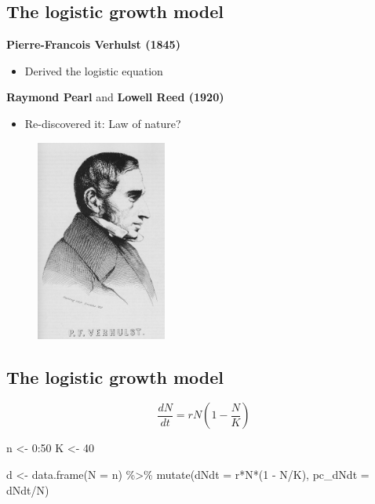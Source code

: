 \documentclass[
  letterpaper,
  DIV=11,
  numbers=noendperiod]{scrartcl}
\newenvironment{Shaded}{\begin{snugshade}}{\end{snugshade}}
\newcommand{\AttributeTok}[1]{\textcolor[rgb]{0.40,0.45,0.13}{#1}}
\newcommand{\DecValTok}[1]{\textcolor[rgb]{0.68,0.00,0.00}{#1}}
\newcommand{\FunctionTok}[1]{\textcolor[rgb]{0.28,0.35,0.67}{#1}}
\newcommand{\NormalTok}[1]{\textcolor[rgb]{0.00,0.23,0.31}{#1}}
\newcommand{\OtherTok}[1]{\textcolor[rgb]{0.00,0.23,0.31}{#1}}
\newcommand{\SpecialCharTok}[1]{\textcolor[rgb]{0.37,0.37,0.37}{#1}}
\providecommand{\tightlist}{%
  \setlength{\itemsep}{0pt}\setlength{\parskip}{0pt}}\usepackage{longtable,booktabs,array}
\begin{document}
\hypertarget{the-logistic-growth-model-3}{%
\subsection{The logistic growth
model}\label{the-logistic-growth-model-3}}

\textbf{Pierre-Francois Verhulst (1845)}

\begin{itemize}
\tightlist
\item
  Derived the logistic equation
\end{itemize}

\textbf{Raymond Pearl} and \textbf{Lowell Reed (1920)}

\begin{itemize}
\tightlist
\item
  Re-discovered it: Law of nature?
\end{itemize}

\begin{figure}

\hfill{} \includegraphics[width=\textwidth,height=2.60417in]{images/verhulst.png}

\end{figure}

\hypertarget{the-logistic-growth-model-4}{%
\subsection{The logistic growth
model}\label{the-logistic-growth-model-4}}

\[\frac{dN}{dt}=rN(1-\frac{N}{K})\]

\begin{Shaded}
\begin{Highlighting}[]
\NormalTok{n }\OtherTok{\textless{}{-}} \DecValTok{0}\SpecialCharTok{:}\DecValTok{50}
\NormalTok{K }\OtherTok{\textless{}{-}} \DecValTok{40}

\NormalTok{d }\OtherTok{\textless{}{-}} \FunctionTok{data.frame}\NormalTok{(}\AttributeTok{N =}\NormalTok{ n) }\SpecialCharTok{\%\textgreater{}\%} 
  \FunctionTok{mutate}\NormalTok{(}\AttributeTok{dNdt =}\NormalTok{ r}\SpecialCharTok{*}\NormalTok{N}\SpecialCharTok{*}\NormalTok{(}\DecValTok{1} \SpecialCharTok{{-}}\NormalTok{ N}\SpecialCharTok{/}\NormalTok{K),}
         \AttributeTok{pc\_dNdt =}\NormalTok{ dNdt}\SpecialCharTok{/}\NormalTok{N)}
\end{Highlighting}
\end{Shaded}
\end{document}
